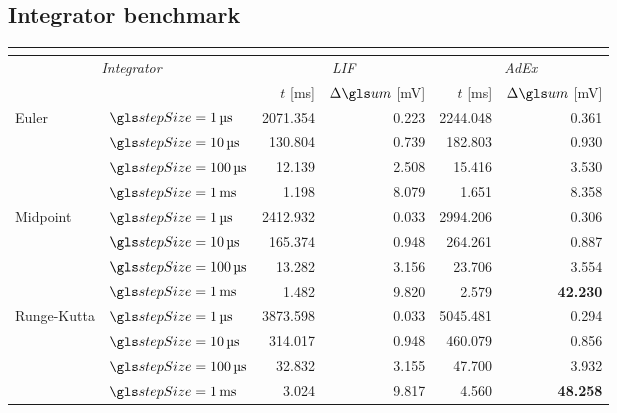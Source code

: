 \subsection{Integrator benchmark}
\label{sec:integrator_benchmark}

\begin{table}
	\small
	\centering
	\begin{tabular}{p{1.75cm} l r r r r}
		\toprule
		\multicolumn{6}{c}{\spacedlowsmallcaps{Neuron simulator benchmark results}} \\
		\midrule
		\multicolumn{2}{c}{\textit{Integrator}} & \multicolumn{2}{c}{\textit{LIF}} & \multicolumn{2}{c}{\textit{AdEx}} \\
		&& $t$ [\si{\milli\second}] & $\Delta\um$ [\si{\milli\volt}] & $t$ [\si{\milli\second}] & $\Delta\um$ [\si{\milli\volt}] \\
		\cmidrule(r){1-2}\cmidrule(r){3-4}\cmidrule(l){5-6}
		\multirow{4}{*}{\parbox{1.5cm}{\raggedleft Euler}}
			& $\stepSize = \SI{1}{\micro\second}$ & 2071.354 & 0.223 & 2244.048 & 0.361\\
			& $\stepSize = \SI{10}{\micro\second}$ & 130.804 & 0.739 & 182.803 & 0.930\\
			& $\stepSize = \SI{100}{\micro\second}$ & 12.139 & 2.508 & 15.416 & 3.530\\
			& $\stepSize = \SI{1}{\milli\second}$ & 1.198 & 8.079 & 1.651 & 8.358\\
		\cmidrule(r){1-2}\cmidrule(r){3-4}\cmidrule(l){5-6}
		\multirow{4}{*}{\parbox{1.5cm}{\raggedleft Midpoint}}
			& $\stepSize = \SI{1}{\micro\second}$ & 2412.932 & 0.033 & 2994.206 & 0.306\\
			& $\stepSize = \SI{10}{\micro\second}$ & 165.374 & 0.948 & 264.261 & 0.887\\
			& $\stepSize = \SI{100}{\micro\second}$ & 13.282 & 3.156 & 23.706 & 3.554\\
			& $\stepSize = \SI{1}{\milli\second}$ & 1.482 & 9.820 & 2.579 & \textbf{42.230}\\
		\cmidrule(r){1-2}\cmidrule(r){3-4}\cmidrule(l){5-6}
		\multirow{4}{*}{\parbox{1.5cm}{\raggedleft Runge-Kutta}}
			& $\stepSize = \SI{1}{\micro\second}$ & 3873.598 & 0.033 & 5045.481 & 0.294\\
 			& $\stepSize = \SI{10}{\micro\second}$ & 314.017 & 0.948 & 460.079 & 0.856\\
			& $\stepSize = \SI{100}{\micro\second}$ & 32.832 & 3.155 & 47.700 & 3.932\\
			& $\stepSize = \SI{1}{\milli\second}$ & 3.024 & 9.817 & 4.560 & \textbf{48.258}\\

\end{tabular}
\end{table}
